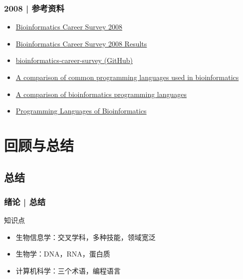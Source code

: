 \begin{frame}
  \frametitle{2008 | 参考资料}
  \begin{itemize}
    \item \href{http://openwetware.org/wiki/Biogang:Projects/Bioinformatics\_Career\_Survey\_2008}{Bioinformatics Career Survey 2008}
    \item \href{http://openwetware.org/wiki/Biogang:Projects/Bioinformatics\_Career\_Survey\_2008\_Results}{Bioinformatics Career Survey 2008 Results}
    \item \href{https://github.com/michaelbarton/bioinformatics-career-survey}{bioinformatics-career-survey (GitHub)}
    \item \href{http://www.ncbi.nlm.nih.gov/pmc/articles/PMC2267699/}{A comparison of common programming languages used in bioinformatics} 
    \item \href{http://www.molecularecologist.com/2012/11/a-comparison-of-bioinformatics-programming-languages/}{A comparison of bioinformatics programming languages} 
    \item \href{https://nlcb.wordpress.com/2013/02/23/programming-languages-of-bioinformatics-2/}{Programming Languages of Bioinformatics} 
  \end{itemize}
\end{frame}

\section{回顾与总结}
\subsection{总结}
\begin{frame}
  \frametitle{绪论 | 总结}
  \begin{block}{知识点}
    \begin{itemize}
      \item 生物信息学：交叉学科，多种技能，领域宽泛
      \item 生物学：DNA，RNA，蛋白质
      \item 计算机科学：三个术语，编程语言
    \end{itemize}
  \end{block}
\end{frame}

